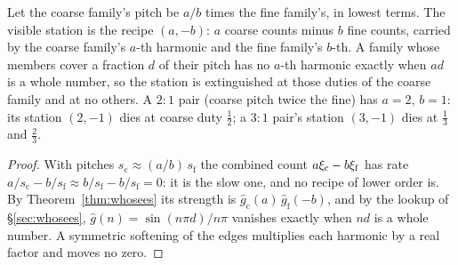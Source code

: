 \begin{theorem}
\label{thm:dutynull}
Let the coarse family's pitch be $a/b$ times the fine family's, in lowest
terms. The visible station is the recipe $(a,-b)$: $a$ coarse counts minus
$b$ fine counts, carried by the coarse family's $a$-th harmonic and the fine
family's $b$-th. A family whose members cover a fraction $d$ of their pitch
has no $a$-th harmonic exactly when $ad$ is a whole number, so the station
is extinguished at those duties of the coarse family and at no others. A
$2{:}1$ pair (coarse pitch twice the fine) has $a=2$, $b=1$: its station
$(2,-1)$ dies at coarse duty $\tfrac12$; a $3{:}1$ pair's station $(3,-1)$
dies at $\tfrac13$ and $\tfrac23$.
\end{theorem}

\begin{proof}
With pitches $s_{\mathrm c}\approx(a/b)\,s_{\mathrm f}$ the combined count
$a\xi_{\mathrm c}-b\xi_{\mathrm f}$ has rate
$a/s_{\mathrm c}-b/s_{\mathrm f}\approx b/s_{\mathrm f}-b/s_{\mathrm f}=0$:
it is the slow one, and no recipe of lower order is. By
Theorem~\ref{thm:whosees} its strength is
$\hat g_{\mathrm c}(a)\,\hat g_{\mathrm f}(-b)$, and by the lookup of
\S\ref{sec:whosees}, $\hat g(n)=\sin(n\pi d)/n\pi$ vanishes exactly when
$nd$ is a whole number. A symmetric softening of the edges multiplies each
harmonic by a real factor and moves no zero.
\end{proof}

